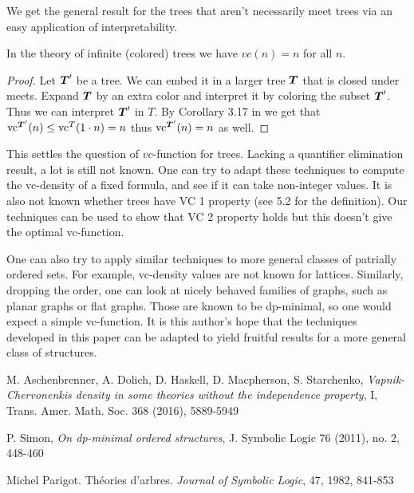 \documentclass{amsart}
\DeclareMathOperator{\TT}{\boldface T}
\begin{document}
We get the general result for the trees that aren't necessarily meet trees via an easy application of interpretability.
\begin{Corollary}
  In the theory of infinite (colored) trees we have $vc(n) = n$ for all $n$.
\end{Corollary}
\begin{proof}
  Let $\TT'$ be a tree. We can embed it in a larger tree $\TT$ that is closed under meets. Expand $\TT$ by an extra color and interpret it by coloring the subset $\TT'$. Thus we can interpret $\TT'$ in $T$. By Corollary 3.17 in \cite{density} we get that $\vc^{\TT'}(n) \leq \vc^T(1 \cdot n) = n$ thus $\vc^{\TT'}(n) = n$ as well.
\end{proof}

This settles the question of $vc$-function for trees. Lacking a quantifier elimination result, a lot is still not known.
One can try to adapt these techniques to compute the vc-density of a fixed formula, and see if it can take non-integer values.
It is also not known whether trees have VC 1 property (see \cite{density} 5.2 for the definition).
Our techniques can be used to show that VC 2 property holds but this doesn't give the optimal vc-function.

One can also try to apply similar techniques to more general classes of patrially ordered sets.
For example, vc-density values are not known for lattices.
Similarly, dropping the order, one can look at nicely behaved families of graphs, such as planar graphs or flat graphs.
Those are known to be dp-minimal, so one would expect a simple vc-function.
It is this author's hope that the techniques developed in this paper can be adapted to yield fruitful results for a more general class of structures.

\begin{thebibliography}{9}

  M. Aschenbrenner, A. Dolich, D. Haskell, D. Macpherson, S. Starchenko,
  \textit{Vapnik-Chervonenkis density in some theories without the independence property}, I,
  Trans. Amer. Math. Soc. 368 (2016), 5889-5949

  P. Simon,
  \textit{On dp-minimal ordered structures},
  J. Symbolic Logic 76 (2011), no. 2, 448-460

  Michel Parigot.
  Th\'eories d'arbres.
  \textit{Journal of Symbolic Logic}, 47, 1982, 841-853
  
  
\end{thebibliography}
\end{document}
